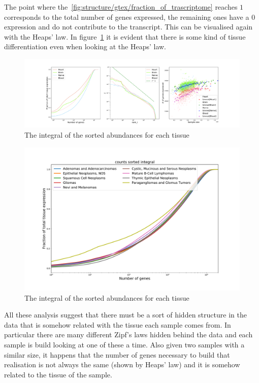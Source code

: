 The point where the~\ref{fig:structure/gtex/fraction_of_trascriptome} reaches $1$ corresponds to the total number of genes expressed, the remaining ones have a $0$ expression and do not contribute to the transcript. This can be visualised again with the Heaps' law. In figure~\ref{fig:structure/gtex/heaps_tissue} it is evident that there is some kind of tissue differentiation even when looking at the Heaps' law.
\begin{figure}[htb!]
  \centering
  \includegraphics[width=0.6\linewidth]{pictures/structure/gtex/heaps_tissue.pdf}
  \caption{The integral of the sorted abundances for each tissue}
  \label{fig:structure/gtex/heaps_tissue}
\end{figure}

\begin{figure}[htb!]
  \centering
  \includegraphics[width=0.6\linewidth]{pictures/structure/tcga/fraction_of_trascriptome_disease.pdf}
  \caption{The integral of the sorted abundances for each tissue}
  \label{fig:structure/gtex/heaps_tissue_disease}
\end{figure}

All these analysis suggest that there must be a sort of hidden structure in the data that is somehow related with the tissue each sample comes from. In particular there are many different Zipf's laws hidden behind the data and each sample is build looking at one of these a time. Also given two samples with a similar size, it happens that the number of genes necessary to build that realisation is not always the same (shown by Heaps' law) and it is somehow related to the tissue of the sample.
